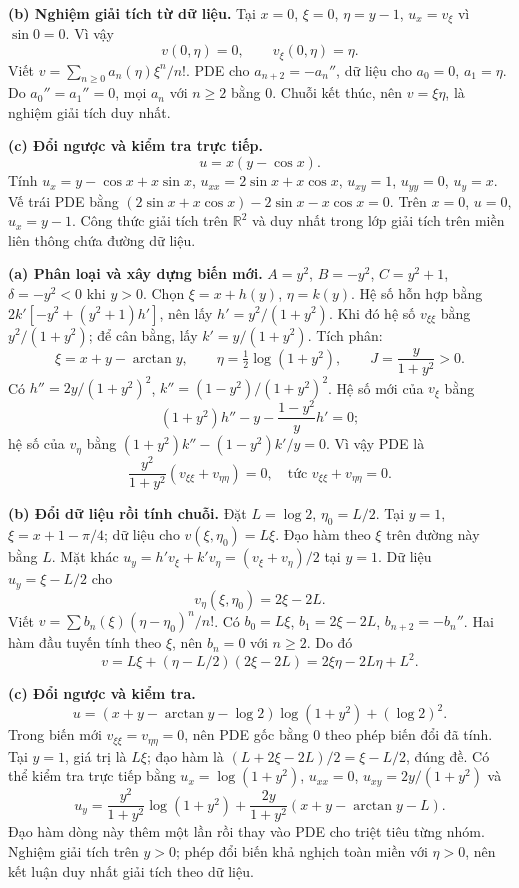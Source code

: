 \textbf{(b) Nghiệm giải tích từ dữ liệu.} Tại $x=0$, $\xi=0$, $\eta=y-1$, $u_x=v_\xi$ vì $\sin0=0$. Vì vậy
\[v(0,\eta)=0,\qquad v_\xi(0,\eta)=\eta.\]
Viết $v=\sum_{n\ge0}a_n(\eta)\xi^n/n!$. PDE cho $a_{n+2}=-a_n''$, dữ liệu cho $a_0=0$, $a_1=\eta$. Do $a_0''=a_1''=0$, mọi $a_n$ với $n\ge2$ bằng $0$. Chuỗi kết thúc, nên $v=\xi\eta$, là nghiệm giải tích duy nhất.

\textbf{(c) Đổi ngược và kiểm tra trực tiếp.}
\[\boxed{u=x(y-\cos x).}\]
Tính $u_x=y-\cos x+x\sin x$, $u_{xx}=2\sin x+x\cos x$, $u_{xy}=1$, $u_{yy}=0$, $u_y=x$. Vế trái PDE bằng $(2\sin x+x\cos x)-2\sin x-x\cos x=0$. Trên $x=0$, $u=0$, $u_x=y-1$. Công thức giải tích trên $\mathbb R^2$ và duy nhất trong lớp giải tích trên miền liên thông chứa đường dữ liệu.

\textbf{(a) Phân loại và xây dựng biến mới.} $A=y^2$, $B=-y^2$, $C=y^2+1$, $\delta=-y^2<0$ khi $y>0$. Chọn $\xi=x+h(y)$, $\eta=k(y)$. Hệ số hỗn hợp bằng $2k'[-y^2+(y^2+1)h']$, nên lấy $h'=y^2/(1+y^2)$. Khi đó hệ số $v_{\xi\xi}$ bằng $y^2/(1+y^2)$; để cân bằng, lấy $k'=y/(1+y^2)$. Tích phân:
\[\xi=x+y-\arctan y,\qquad\eta=\tfrac12\log(1+y^2),\qquad J=\frac y{1+y^2}>0.\]
Có $h''=2y/(1+y^2)^2$, $k''=(1-y^2)/(1+y^2)^2$. Hệ số mới của $v_\xi$ bằng
\[(1+y^2)h''-y-\frac{1-y^2}{y}h'=0;\]
hệ số của $v_\eta$ bằng $(1+y^2)k''-(1-y^2)k'/y=0$. Vì vậy PDE là
\[\frac{y^2}{1+y^2}(v_{\xi\xi}+v_{\eta\eta})=0,\quad\text{tức }v_{\xi\xi}+v_{\eta\eta}=0.\]

\textbf{(b) Đổi dữ liệu rồi tính chuỗi.} Đặt $L=\log2$, $\eta_0=L/2$. Tại $y=1$, $\xi=x+1-\pi/4$; dữ liệu cho $v(\xi,\eta_0)=L\xi$. Đạo hàm theo $\xi$ trên đường này bằng $L$. Mặt khác $u_y=h'v_\xi+k'v_\eta=(v_\xi+v_\eta)/2$ tại $y=1$. Dữ liệu $u_y=\xi-L/2$ cho
\[v_\eta(\xi,\eta_0)=2\xi-2L.\]
Viết $v=\sum b_n(\xi)(\eta-\eta_0)^n/n!$. Có $b_0=L\xi$, $b_1=2\xi-2L$, $b_{n+2}=-b_n''$. Hai hàm đầu tuyến tính theo $\xi$, nên $b_n=0$ với $n\ge2$. Do đó
\[v=L\xi+(\eta-L/2)(2\xi-2L)=2\xi\eta-2L\eta+L^2.\]

\textbf{(c) Đổi ngược và kiểm tra.}
\[\boxed{u=(x+y-\arctan y-\log2)\log(1+y^2)+(\log2)^2.}\]
Trong biến mới $v_{\xi\xi}=v_{\eta\eta}=0$, nên PDE gốc bằng $0$ theo phép biến đổi đã tính. Tại $y=1$, giá trị là $L\xi$; đạo hàm là $(L+2\xi-2L)/2=\xi-L/2$, đúng đề. Có thể kiểm tra trực tiếp bằng $u_x=\log(1+y^2)$, $u_{xx}=0$, $u_{xy}=2y/(1+y^2)$ và
\[u_y=\frac{y^2}{1+y^2}\log(1+y^2)+\frac{2y}{1+y^2}(x+y-\arctan y-L).\]
Đạo hàm dòng này thêm một lần rồi thay vào PDE cho triệt tiêu từng nhóm. Nghiệm giải tích trên $y>0$; phép đổi biến khả nghịch toàn miền với $\eta>0$, nên kết luận duy nhất giải tích theo dữ liệu.

